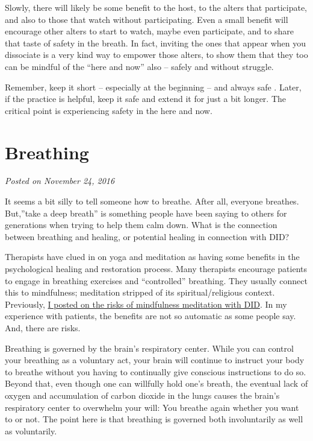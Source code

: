 \documentclass[]{book}
\begin{document}
Slowly, there will likely be some benefit to the host, to the alters that participate, and also to those that watch without participating. Even a small benefit will encourage other alters to start to watch, maybe even participate, and to share that taste of safety in the breath. In fact, inviting the ones that appear when you dissociate is a very kind way to empower those alters, to show them that they too can be mindful of the ``here and now'' also -- safely and without struggle.

Remember, keep it short -- especially at the beginning -- and always safe . Later, if the practice is helpful, keep it safe and extend it for just a bit longer. The critical point is experiencing safety in the here and now.

\hypertarget{breathing}{%
\section{Breathing}\label{breathing}}

\emph{Posted on November 24, 2016}

It seems a bit silly to tell someone how to breathe. After all, everyone breathes. But,''take a deep breath'' is something people have been saying to others for generations when trying to help them calm down. What is the connection between breathing and healing, or potential healing in connection with DID?

Therapists have clued in on yoga and meditation as having some benefits in the psychological healing and restoration process. Many therapists encourage patients to engage in breathing exercises and ``controlled'' breathing. They usually connect this to mindfulness; meditation stripped of its spiritual/religious context. Previously, \href{https://www.engagingmultiples.com/mindfulness-meditation-and-did/}{I posted on the risks of mindfulness meditation with DID}. In my experience with patients, the benefits are not so automatic as some people say. And, there are risks.

Breathing is governed by the brain's respiratory center. While you can control your breathing as a voluntary act, your brain will continue to instruct your body to breathe without you having to continually give conscious instructions to do so. Beyond that, even though one can willfully hold one's breath, the eventual lack of oxygen and accumulation of carbon dioxide in the lungs causes the brain's respiratory center to overwhelm your will: You breathe again whether you want to or not. The point here is that breathing is governed both involuntarily as well as voluntarily.
\end{document}
